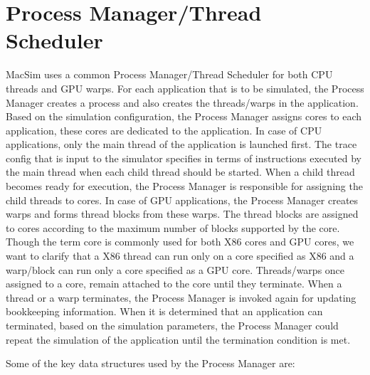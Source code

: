 
\clearpage
\section{Process Manager/Thread Scheduler}

MacSim uses a common Process Manager/Thread Scheduler for both CPU threads and
GPU warps. For each application that is to be simulated, the Process Manager
creates a process and also creates the threads/warps in the application. Based
on the simulation configuration, the Process Manager assigns cores to each
application, these cores are dedicated to the application. In case of CPU
applications, only the main thread of the application is launched first. The
trace config that is input to the simulator specifies in terms of instructions
executed by the main thread when each child thread should be started. When a
child thread becomes ready for execution, the Process Manager is responsible
for assigning the child threads to cores. In case of GPU applications, the
Process Manager creates warps and forms thread blocks from these warps. The
thread blocks are assigned to cores according to the maximum number of blocks
supported by the core. Though the term core is commonly used for both X86 cores
and GPU cores, we want to clarify that a X86 thread can run only on a core
specified as X86 and a warp/block can run only a core specified as a GPU core.
Threads/warps once assigned to a core, remain attached to the core until they
terminate. When a thread or a warp terminates, the Process Manager is invoked
again for updating bookkeeping information. When it is determined that an
application can terminated, based on the simulation parameters, the Process
Manager could repeat the simulation of the application until the termination
condition is met.



Some of the key data structures used by the Process Manager are:


